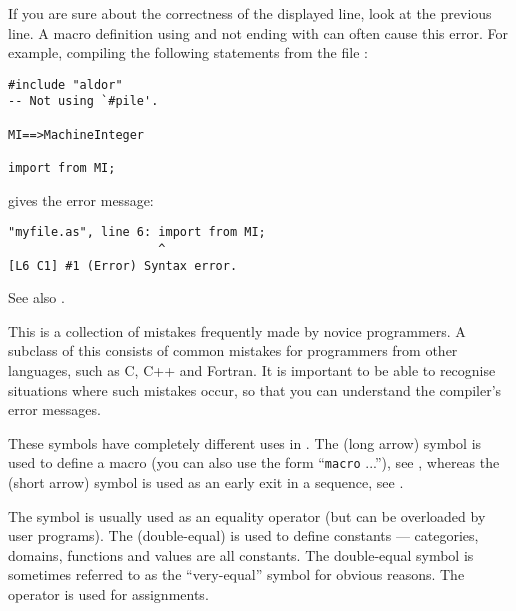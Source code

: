 If you are sure about the correctness of the displayed line, look at the
previous line. A macro definition using \ttin{==>} and not ending
with \ttin{;} can often cause this error. For example, compiling the following
statements from the file :

{\small
\begin{verbatim}
#include "aldor"
-- Not using `#pile'.

MI==>MachineInteger

import from MI;
\end{verbatim}
}

gives the error message:
{\small
\begin{verbatim}
"myfile.as", line 6: import from MI;
                     ^
[L6 C1] #1 (Error) Syntax error.
\end{verbatim}
}
See also .


This is a collection of mistakes frequently made by novice \asharp{}
programmers. A subclass of this consists of common mistakes for
programmers from other languages, such as C, C++ and Fortran.  It is
important to be able to recognise situations where such mistakes occur,
so that you can understand the compiler's error messages.


These symbols have completely different uses in \asharp{}. The
\ttin{==>} (long arrow) symbol is used to define a macro (you can
also use the form ``{\tt macro} ...''), see ,
whereas the \ttin{=>} (short arrow) symbol is used as an early exit in a
sequence, see .


The \ttin{=} symbol is usually used as an equality operator (but can
be overloaded by user programs). The \ttin{==} (double-equal) is used
to define constants --- categories, domains, functions and values are
all \asharp{} constants. The double-equal symbol is sometimes referred
to as the ``very-equal'' symbol for obvious reasons. The \ttin{:=}
operator is used for assignments.


